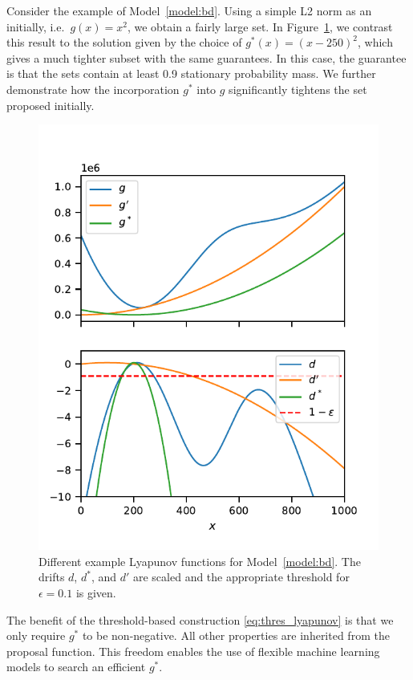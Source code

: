 \begin{example}
Consider the example of Model~\ref{model:bd}.
Using a simple L2 norm as an initially, i.e.\ $g(x) = x^2$, we obtain a fairly large set.
In Figure~\ref{fig:bd:truncation}, we contrast this result to the solution given by the choice of $g^*(x)=(x - 250)^2$, which gives a much tighter subset with the same guarantees.
In this case, the guarantee is that the sets contain at least 0.9 stationary probability mass.
We further demonstrate how the incorporation $g^*$ into $g$ significantly tightens the set proposed initially.
\begin{figure}[htb]
    \centering
    \includegraphics[width=.6\textwidth]{gfx/lyapunov_bd.pdf}
    \caption[Manually augmented Foster-Lyapunov function]{\label{fig:bd:truncation}Different example Lyapunov functions for Model~\ref{model:bd}. The drifts $d$, $d^*$, and $d'$ are scaled and the appropriate threshold for $\epsilon=0.1$ is given.}
\end{figure}
\end{example}


The benefit of the threshold-based construction \eqref{eq:thres_lyapunov} is that we only require $g^*$ to be non-negative.
All other properties are inherited from the proposal function.
This freedom enables the use of flexible machine learning models to search an efficient $g^*$.

